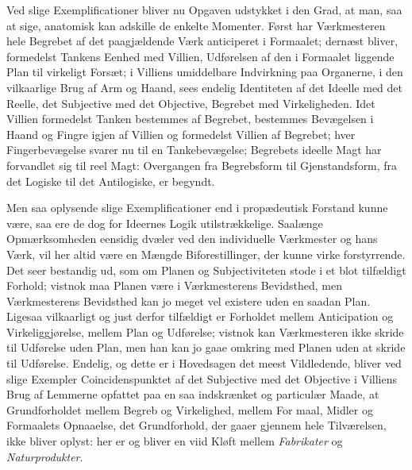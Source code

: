 \documentclass[12pt]{book}
\newcommand{\opage}[1]{\marginnote{\footnotesize\textit{[#1]}}}
\begin{document}
\opage{129}Ved slige Exemplificationer bliver nu Opgaven udstykket i
den Grad, at man, saa at sige, anatomisk kan adskille de
enkelte Momenter. Først har Værkmesteren hele Begrebet af
det paagjældende Værk anticiperet i Formaalet; dernæst bliver,
formedelst Tankens Eenhed med Villien, Udførelsen af den i
Formaalet liggende Plan til virkeligt Forsæt; i Villiens
umiddelbare Indvirkning paa Organerne, i den vilkaarlige
Brug af Arm og Haand, sees endelig Identiteten af det Ideelle
med det Reelle, det Subjective med det Objective, Begrebet
med Virkeligheden. Idet Villien formedelst Tanken bestemmes
af Begrebet, bestemmes Bevægelsen i Haand og Fingre igjen
af Villien og formedelst Villien af Begrebet; hver Fingerbevægelse
svarer nu til en Tankebevægelse; Begrebets ideelle
Magt har forvandlet sig til reel Magt: Overgangen fra Begrebsform
til Gjenstandsform, fra det Logiske til det Antilogiske,
er begyndt.

Men saa oplysende slige Exemplificationer end i propædeutisk
Forstand kunne være, saa ere de dog for Ideernes
Logik utilstrækkelige. Saalænge Opmærksomheden eensidig
dvæler ved den individuelle Værkmester og hans Værk, vil her
altid være en Mængde Biforestillinger, der kunne virke forstyrrende.
Det seer bestandig ud, som om Planen og Subjectiviteten
stode i et blot tilfældigt Forhold; vistnok maa
Planen være i Værkmesterens Bevidsthed, men Værkmesterens
Bevidsthed kan jo meget vel existere uden en saadan Plan.
Ligesaa vilkaarligt og just derfor tilfældigt er Forholdet mellem
Anticipation og Virkeliggjørelse, mellem Plan og Udførelse;
vistnok kan Værkmesteren ikke skride til Udførelse uden Plan,
men han kan jo gaae omkring med Planen uden at skride til
Udførelse. Endelig, og dette er i Hovedsagen det meest Vildledende,
bliver ved slige Exempler Coincidenspunktet af det
Subjective med det Objective i Villiens Brug af Lemmerne
opfattet paa en saa indskrænket og particulær Maade, at
Grundforholdet mellem Begreb og Virkelighed, mellem For%
\opage{130}maal, Midler og Formaalets Opnaaelse, det Grundforhold,
der gaaer gjennem hele Tilværelsen, ikke bliver oplyst: her
er og bliver en viid Kløft mellem \emph{Fabrikater} og \emph{Naturprodukter}.
\end{document}
